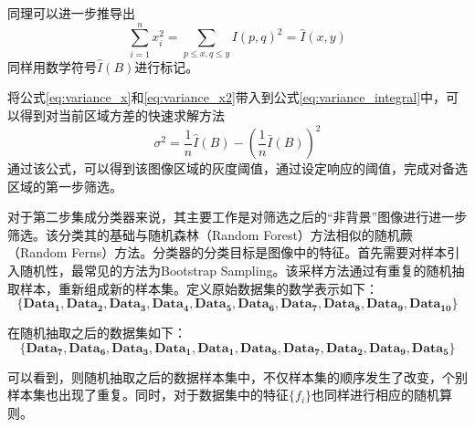 同理可以进一步推导出
\begin{equation}
\label{eq:variance_x2}
\sum_{i=1}^nx_i^2 = \sum_{p \le x, q \le y}I(p,q)^2 = \hat{I}(x,y)
\end{equation}
同样用数学符号$\hat{I}(B)$进行标记。

将公式\ref{eq:variance_x}和\ref{eq:variance_x2}带入到公式\ref{eq:variance_integral}中，可以得到对当前区域方差的快速求解方法
\begin{equation}
\sigma^2=\frac{1}{n}\hat{I}(B)-(\frac{1}{n}\bar{I}(B))^2
\end{equation}
通过该公式，可以得到该图像区域的灰度阈值，通过设定响应的阈值，完成对备选区域的第一步筛选。

对于第二步集成分类器来说，其主要工作是对筛选之后的“非背景”图像进行进一步筛选。该分类其的基础与随机森林（Random Forest）方法相似的随机蕨（Random Ferns）方法。分类器的分类目标是图像中的特征。首先需要对样本引入随机性，最常见的方法为Bootstrap Sampling。该采样方法通过有重复的随机抽取样本，重新组成新的样本集。定义原始数据集的数学表示如下：
$$\mathbf{\{Dat}{{\mathbf{a}}_{\mathbf{1}}}\mathbf{,Dat}{{\mathbf{a}}_{\mathbf{2}}}\mathbf{,Dat}{{\mathbf{a}}_{\mathbf{3}}}\mathbf{,Dat}{{\mathbf{a}}_{\mathbf{4}}}\mathbf{,Dat}{{\mathbf{a}}_{\mathbf{5}}}\mathbf{,Dat}{{\mathbf{a}}_{\mathbf{6}}}\mathbf{,Dat}{{\mathbf{a}}_{\mathbf{7}}}\mathbf{,Dat}{{\mathbf{a}}_{\mathbf{8}}}\mathbf{,Dat}{{\mathbf{a}}_{\mathbf{9}}}\mathbf{,Dat}{{\mathbf{a}}_{\mathbf{10}}}\mathbf{\}}$$

在随机抽取之后的数据集如下：
$$\mathbf{\{Dat}{{\mathbf{a}}_{\mathbf{7}}}\mathbf{,Dat}{{\mathbf{a}}_{\mathbf{6}}}\mathbf{,Dat}{{\mathbf{a}}_{\mathbf{3}}}\mathbf{,Dat}{{\mathbf{a}}_{\mathbf{1}}}\mathbf{,Dat}{{\mathbf{a}}_{\mathbf{1}}}\mathbf{,Dat}{{\mathbf{a}}_{\mathbf{8}}}\mathbf{,Dat}{{\mathbf{a}}_{\mathbf{7}}}\mathbf{,Dat}{{\mathbf{a}}_{\mathbf{2}}}\mathbf{,Dat}{{\mathbf{a}}_{\mathbf{9}}}\mathbf{,Dat}{{\mathbf{a}}_{\mathbf{5}}}\mathbf{\}}$$

可以看到，则随机抽取之后的数据样本集中，不仅样本集的顺序发生了改变，个别样本集也出现了重复。同时，对于数据集中的特征$\{f_i\}$也同样进行相应的随机算则。

